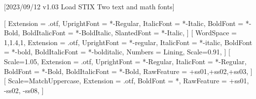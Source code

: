 
[2023/09/12 v1.03 Load STIX Two text and math fonts]

%
%
\ifpdftex
	\RequirePackage[T1]{fontenc}	
	\RequirePackage{bm}
\else
    \RequirePackage[warnings-off={mathtools-colon,mathtools-overbracket}]{unicode-math}
    \setmainfont{STIXTwoText}[%
       	Extension = .otf,
    	UprightFont = *-Regular,
    	ItalicFont = *-Italic,
    	BoldFont = *-Bold,
    	BoldItalicFont = *-BoldItalic,
		SlantedFont = *-Italic,
	]
	\setsansfont{texgyreheros}[%
		WordSpace = {1,1.4,1},
		Extension = .otf,
    	UprightFont = *-regular,
    	ItalicFont = *-italic,
    	BoldFont = *-bold,
    	BoldItalicFont = *-bolditalic,
		Numbers = Lining,
    	Scale=0.91,%
	]        
	\setmonofont{Inconsolatazi4}[%
        Scale=1.05,%
        Extension = .otf,
        UprightFont = *-Regular,
        ItalicFont = *-Regular,%
        BoldFont = *-Bold, 
    	BoldItalicFont = *-Bold,%
        RawFeature = {+ss01,+ss02,+ss03},
    ]             
	[%
    	Scale=MatchUppercase,
    	Extension = .otf,
		BoldFont = *,%
    	RawFeature = {+ss01, -ss02, -ss08},
   ]
   \newcommand*{\FRAC}[1]{{\addfontfeature{Fractions=On}#1}}%
\fi
